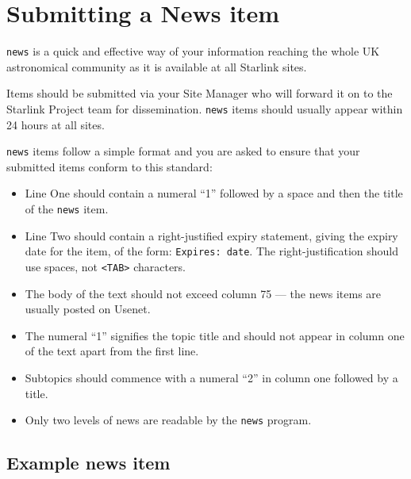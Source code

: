 \documentclass[11pt,nolof,noabs]{starlink}
\begin{document}
\section{Submitting a News item}

\texttt{news} is a quick and effective way of your information reaching
the whole UK astronomical community as it is available at all Starlink
sites.

Items should be submitted via your Site Manager who will forward it on
to the Starlink Project team for dissemination. \texttt{news} items should
usually appear within 24 hours at all sites.

\texttt{news} items follow a simple format and you are asked to ensure that
your submitted items conform to this standard:

\begin{itemize}

\item Line One should contain a numeral ``1'' followed by a space and then
the title of the \texttt{news} item.

\item Line Two should contain a right-justified expiry statement,
giving the expiry date for the item, of the form: \texttt{Expires: date}.
The right-justification should use spaces, not \texttt{<TAB>} characters.

\item The body of the text should not exceed column 75 ---
the news items are usually posted on Usenet.

\item The numeral ``1'' signifies the topic title and should not appear
in column one of the text apart from the first line.

\item Subtopics should commence with a numeral ``2'' in column one followed
by a title.

\item Only two levels of news are readable by the \texttt{news} program.

\end{itemize}

\subsection{Example news item}
\end{document}
